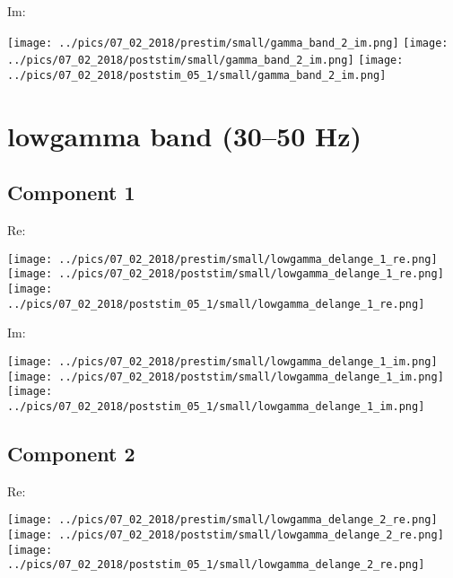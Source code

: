 \documentclass{article}
\begin{document}
Im:

\hspace{0.5cm}
\texttt{[image: ../pics/07\_02\_2018/prestim/small/gamma\_band\_2\_im.png]}
\hspace{0.5cm}
\texttt{[image: ../pics/07\_02\_2018/poststim/small/gamma\_band\_2\_im.png]}
\hspace{0.5cm}
\texttt{[image: ../pics/07\_02\_2018/poststim\_05\_1/small/gamma\_band\_2\_im.png]}

\section{lowgamma band (30--50 Hz)}
\subsection*{Component 1}
Re:

\hspace{0.5cm}
\texttt{[image: ../pics/07\_02\_2018/prestim/small/lowgamma\_delange\_1\_re.png]}
\hspace{0.5cm}
\texttt{[image: ../pics/07\_02\_2018/poststim/small/lowgamma\_delange\_1\_re.png]}
\hspace{0.5cm}
\texttt{[image: ../pics/07\_02\_2018/poststim\_05\_1/small/lowgamma\_delange\_1\_re.png]}

Im:

\hspace{0.5cm}
\texttt{[image: ../pics/07\_02\_2018/prestim/small/lowgamma\_delange\_1\_im.png]}
\hspace{0.5cm}
\texttt{[image: ../pics/07\_02\_2018/poststim/small/lowgamma\_delange\_1\_im.png]}
\hspace{0.5cm}
\texttt{[image: ../pics/07\_02\_2018/poststim\_05\_1/small/lowgamma\_delange\_1\_im.png]}

\subsection*{Component 2}
Re:

\hspace{0.5cm}
\texttt{[image: ../pics/07\_02\_2018/prestim/small/lowgamma\_delange\_2\_re.png]}
\hspace{0.5cm}
\texttt{[image: ../pics/07\_02\_2018/poststim/small/lowgamma\_delange\_2\_re.png]}
\hspace{0.5cm}
\texttt{[image: ../pics/07\_02\_2018/poststim\_05\_1/small/lowgamma\_delange\_2\_re.png]}
\end{document}
